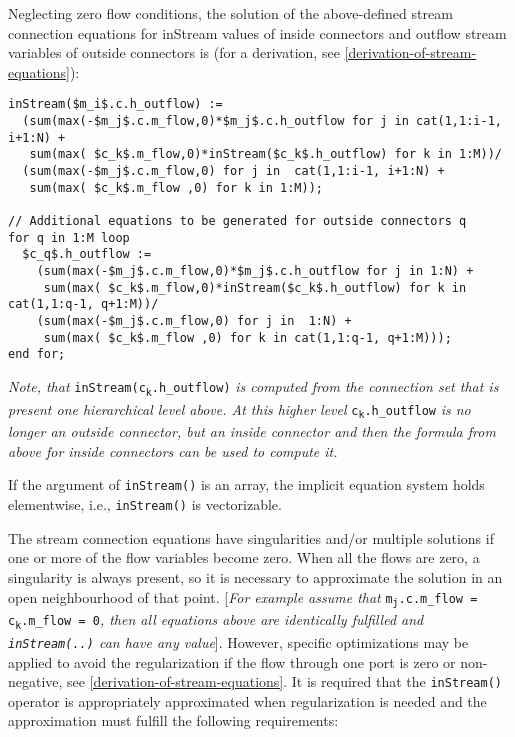 Neglecting zero flow conditions, the solution of the above-defined
stream connection equations for inStream values of inside connectors and
outflow stream variables of outside connectors is (for a derivation, see
\autoref{derivation-of-stream-equations}):

\begin{lstlisting}[language=modelica,mathescape=true]
inStream($m_i$.c.h_outflow) :=
  (sum(max(-$m_j$.c.m_flow,0)*$m_j$.c.h_outflow for j in cat(1,1:i-1, i+1:N) +
   sum(max( $c_k$.m_flow,0)*inStream($c_k$.h_outflow) for k in 1:M))/
  (sum(max(-$m_j$.c.m_flow,0) for j in  cat(1,1:i-1, i+1:N) +
   sum(max( $c_k$.m_flow ,0) for k in 1:M));

// Additional equations to be generated for outside connectors q
for q in 1:M loop
  $c_q$.h_outflow :=
    (sum(max(-$m_j$.c.m_flow,0)*$m_j$.c.h_outflow for j in 1:N) +
     sum(max( $c_k$.m_flow,0)*inStream($c_k$.h_outflow) for k in cat(1,1:q-1, q+1:M))/
    (sum(max(-$m_j$.c.m_flow,0) for j in  1:N) +
     sum(max( $c_k$.m_flow ,0) for k in cat(1,1:q-1, q+1:M)));
end for;
\end{lstlisting}

\emph{Note, that} \texttt{inStream(c\textsubscript{k}.h\_outflow)} \emph{is
computed from the connection set that is present one hierarchical level
above. At this higher level} \texttt{c\textsubscript{k}.h\_outflow} \emph{is no longer
an outside connector, but an inside connector and then the formula from
above for inside connectors can be used to compute it.}

If the argument of \lstinline!inStream()! is an array, the implicit
equation system holds elementwise, i.e., \lstinline!inStream()! is
vectorizable.

The stream connection equations have singularities and/or multiple
solutions if one or more of the flow variables become zero. When all the
flows are zero, a singularity is always present, so it is necessary to
approximate the solution in an open neighbourhood of that point.
{[}\emph{For example assume that} \texttt{m\textsubscript{j}.c.m\_flow =
c\textsubscript{k}.m\_flow = 0}\emph{, then all equations above are identically
fulfilled and \lstinline!inStream(..)! can have any value}{]}. However,
specific optimizations may be applied to avoid the regularization if the
flow through one port is zero or non-negative, see \autoref{derivation-of-stream-equations}. It is
required that the \lstinline!inStream()! operator is appropriately
approximated when regularization is needed and the approximation must
fulfill the following requirements:

